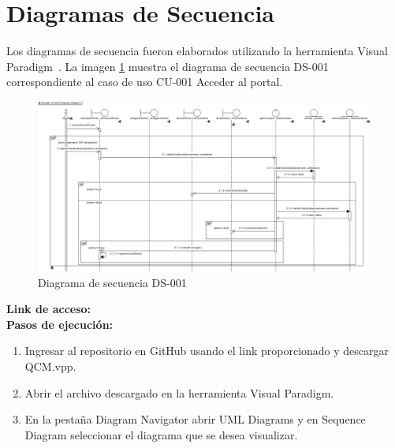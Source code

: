 \section{Diagramas de Secuencia}
Los diagramas de secuencia fueron elaborados utilizando la herramienta {Visual Paradigm}~\cite{staruml2024}. La imagen \ref{DiagSec} muestra el diagrama de secuencia DS-001 correspondiente al caso de uso CU-001 Acceder al portal.


\begin{figure}[H]
    \centering
    \includegraphics[width=0.95\linewidth]{Media/4_Disenio/CU-001_1.png}
    \caption{Diagrama de secuencia DS-001}
    \label{DiagSec}
\end{figure}


\textbf{Link de acceso:} \linkDiagramaSecuencia \\

\textbf{Pasos de ejecución:}
\begin{enumerate}
    \item Ingresar al repositorio en GitHub usando el link proporcionado y descargar QCM.vpp.
    \item Abrir el archivo descargado en la herramienta Visual Paradigm.
    \item En la pestaña Diagram Navigator abrir UML Diagrams y en Sequence Diagram seleccionar el diagrama que se desea visualizar.
\end{enumerate}
\newpage